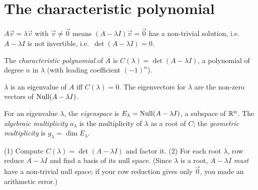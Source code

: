 \section{The characteristic polynomial}

$A\vec v=\lambda\vec v$ with $\vec v\ne\vec0$ means $(A-\lambda I)\vec v=\vec0$ has a non-trivial solution,
i.e.\ $A-\lambda I$ is not invertible, i.e.\ $\det(A-\lambda I)=0$.

\begin{definition}
The \emph{characteristic polynomial} of $A$ is $C(\lambda)=\det(A-\lambda I)$, a polynomial of degree $n$
in $\lambda$ (with leading coefficient $(-1)^n$).
\end{definition}

\begin{theorem}
$\lambda$ is an eigenvalue of $A$ iff $C(\lambda)=0$. The eigenvectors for $\lambda$ are the non-zero
vectors of $\operatorname{Null}(A-\lambda I)$.
\end{theorem}

\begin{definition}
For an eigenvalue $\lambda$, the \emph{eigenspace} is $E_\lambda=\operatorname{Null}(A-\lambda I)$, a subspace of
$\mathbb{R}^n$. The \emph{algebraic multiplicity} $a_\lambda$ is the multiplicity of $\lambda$ as a root of $C$;
the \emph{geometric multiplicity} is $g_\lambda=\dim E_\lambda$.
\end{definition}

\begin{important}[Algorithm]
(1) Compute $C(\lambda)=\det(A-\lambda I)$ and factor it. (2) For each root $\lambda$, row reduce
$A-\lambda I$ and find a basis of its null space. (Since $\lambda$ is a root, $A-\lambda I$ \emph{must}
have a non-trivial null space; if your row reduction gives only $\vec 0$, you made an arithmetic error.)
\end{important}

